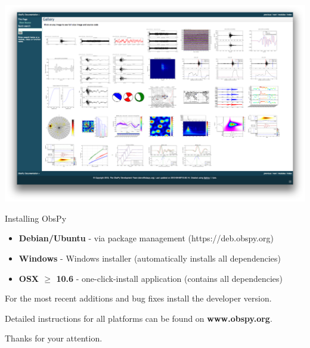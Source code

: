 \documentclass[handout]{beamer}
\begin{document}
\begin{frame}[plain]
\includegraphics[width=\textwidth]{./gallery.png}
\end{frame}



\begin{frame}[plain]{Installing ObsPy}
    \begin{itemize}
        \item \textbf{Debian/Ubuntu} - via package management (https://deb.obspy.org)
        \item \textbf{Windows} - Windows installer (automatically installs all dependencies)
        \item \textbf{OSX $\ge$ 10.6} - one-click-install application (contains all dependencies)
    \end{itemize}
    For the most recent additions and bug fixes install the developer version.

    \vspace{2em}

    Detailed instructions for all platforms can be found on \textbf{www.obspy.org}.
\end{frame}


\begin{frame}[plain]{}
    \begin{center}
        \textcolor{lmu@darkgreen}{\LARGE{Thanks for your attention.}}
    \end{center}
\end{frame}
\end{document}
